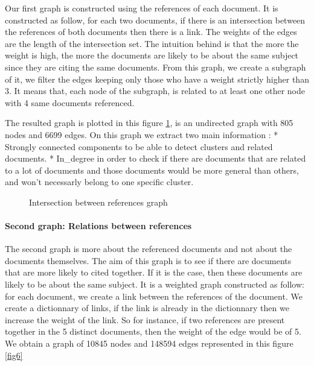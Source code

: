 \documentclass[article,twocolumn]{IEEEtran}
\begin{document}
Our first graph is constructed using the references of each document. It
is constructed as follow, for each two documents, if there is an
intersection between the references of both documents then there is a
link. The weights of the edges are the length of the intersection set.
The intuition behind is that the more the weight is high, the more the
documents are likely to be about the same subject since they are citing
the same documents. From this graph, we create a subgraph of it, we
filter the edges keeping only those who have a weight strictly higher
than 3. It means that, each node of the subgraph, is related to at least
one other node with 4 same documents referenced.



    The resulted graph is plotted in this figure \ref{intersection}, is an
undirected graph with 805 nodes and 6699 edges. On this graph we extract
two main information : * Strongly connected components to be able to
detect clusters and related documents. * In\_degree in order to check if
there are documents that are related to a lot of documents and those
documents would be more general than others, and won't necessarly belong
to one specific cluster.


    \begin{figure}
        \begin{center}\end{center}
        \caption{Intersection between references graph}
        \label{intersection}
    \end{figure}
    
    \hypertarget{second-graph-relations-between-references}{%
\paragraph{Second graph: Relations between
references}\label{second-graph-relations-between-references}}

The second graph is more about the referenced documents and not about
the documents themselves. The aim of this graph is to see if there are
documents that are more likely to cited together. If it is the case,
then these documents are likely to be about the same subject. It is a
weighted graph constructed as follow: for each document, we create a
link between the references of the document. We create a dictionnary of
links, if the link is already in the dictionnary then we increase the
weight of the link. So for instance, if two references are present
together in the 5 distinct documents, then the weight of the edge would
be of 5. We obtain a graph of 10845 nodes and 148594 edges represented
in this figure \ref{fig6}
\end{document}
